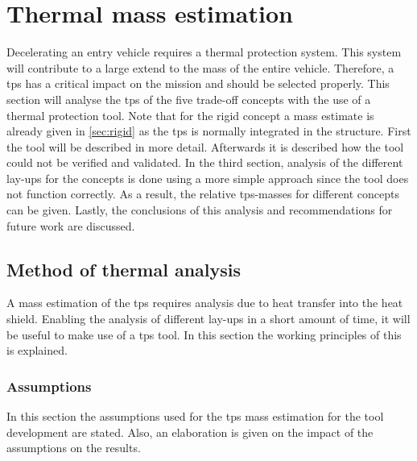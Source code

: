 \section{Thermal mass estimation}
\label{ch:thermtool}
Decelerating an entry vehicle requires a thermal protection system. This system will contribute to a large extend to the mass of the entire vehicle. Therefore, a \acrfull{tps} has a critical impact on the mission and should be selected properly. This section will analyse the \gls{tps} of the five trade-off concepts with the use of a thermal protection tool. Note that for the rigid concept a mass estimate is already given in \ref{sec:rigid} as the \gls{tps} is normally integrated in the structure. First the tool will be described in more detail. Afterwards it is described how the tool could not be verified and validated. In the third section, analysis of the different lay-ups for the concepts is done using a more simple approach since the tool does not function correctly. As a result, the relative \gls{tps}-masses for different concepts can be given. Lastly, the conclusions of this analysis and recommendations for future work are discussed.

\subsection{Method of thermal analysis}
A mass estimation of the \gls{tps} requires analysis due to heat transfer into the heat shield. Enabling the analysis of different lay-ups in a short amount of time, it will be useful to make use of a \gls{tps} tool. In this section the working principles of this is explained.

\subsubsection{Assumptions}
In this section the assumptions used for the \gls{tps} mass estimation for the tool development are stated. Also, an elaboration is given on the impact of the assumptions on the results.

